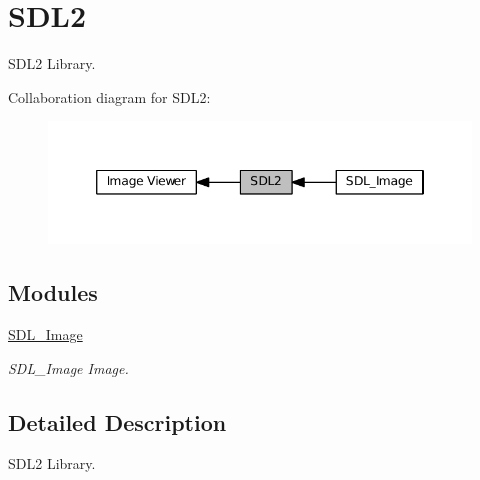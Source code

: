 \hypertarget{group__SDL}{}\section{S\+D\+L2}
\label{group__SDL}


S\+D\+L2 Library.  


Collaboration diagram for S\+D\+L2\+:
\nopagebreak
\begin{figure}[H]
\begin{center}
\leavevmode
\includegraphics[width=346pt]{group__SDL}
\end{center}
\end{figure}
\subsection*{Modules}
\begin{DoxyCompactItemize}
\item 
\hyperlink{group__SDL__Image}{S\+D\+L\+\_\+\+Image}
\begin{DoxyCompactList}\small\item\em S\+D\+L\+\_\+\+Image Image. \end{DoxyCompactList}\end{DoxyCompactItemize}


\subsection{Detailed Description}
S\+D\+L2 Library. 

